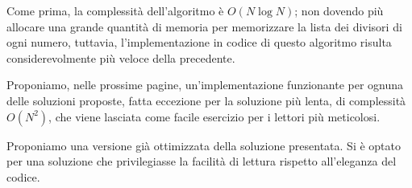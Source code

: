 Come prima, la complessità dell'algoritmo è $O(N \log N)$; non dovendo più allocare una grande quantità di memoria per memorizzare la lista dei divisori di ogni numero, tuttavia, l'implementazione in codice di questo algoritmo risulta considerevolmente più veloce della precedente.

\Cppsol
Proponiamo, nelle prossime pagine, un'implementazione funzionante per ognuna delle soluzioni proposte, fatta eccezione per la soluzione più lenta, di complessità $O(N^2)$, che viene lasciata come facile esercizio per i lettori più meticolosi.

\CppNsqrtN
\colorbox{white}{}

\CppNlogNLenta
Proponiamo una versione già ottimizzata della soluzione presentata. Si è optato per una soluzione che privilegiasse la facilità di lettura rispetto all'eleganza del codice.

\colorbox{white}{}


\CppNlogNVeloce
\colorbox{white}{}


\afterpage{\nopagecolor}
